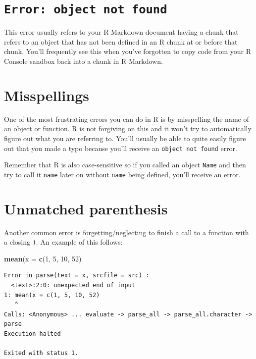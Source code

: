 \documentclass[]{tufte-book}
\newenvironment{Shaded}{\begin{snugshade}}{\end{snugshade}}
\newcommand{\KeywordTok}[1]{\textcolor[rgb]{0.13,0.29,0.53}{\textbf{{#1}}}}
\newcommand{\DataTypeTok}[1]{\textcolor[rgb]{0.13,0.29,0.53}{{#1}}}
\newcommand{\DecValTok}[1]{\textcolor[rgb]{0.00,0.00,0.81}{{#1}}}
\newcommand{\NormalTok}[1]{{#1}}
\begin{document}
\section{\texorpdfstring{\texttt{Error:\ object\ not\ found}}{Error: object not found}}\label{error-object-not-found}

This error usually refers to your R Markdown document having a chunk
that refers to an object that has not been defined in an R chunk at or
before that chunk. You'll frequently see this when you've forgotten to
copy code from your R Console sandbox back into a chunk in R Markdown.

\section{Misspellings}\label{misspellings}

One of the most frustrating errors you can do in R is by misspelling the
name of an object or function. R is not forgiving on this and it won't
try to automatically figure out what you are referring to. You'll
usually be able to quite easily figure out that you made a typo because
you'll receive an \texttt{object\ not\ found} error.

Remember that R is also case-sensitive so if you called an object
\texttt{Name} and then try to call it \texttt{name} later on without
\texttt{name} being defined, you'll receive an error.

\section{Unmatched parenthesis}\label{unmatched-parenthesis}

Another common error is forgetting/neglecting to finish a call to a
function with a closing \texttt{)}. An example of this follows:

\begin{Shaded}
\begin{Highlighting}[]
\KeywordTok{mean}\NormalTok{(}\DataTypeTok{x =} \KeywordTok{c}\NormalTok{(}\DecValTok{1}\NormalTok{, }\DecValTok{5}\NormalTok{, }\DecValTok{10}\NormalTok{, }\DecValTok{52}\NormalTok{)}
\end{Highlighting}
\end{Shaded}

\begin{verbatim}
Error in parse(text = x, srcfile = src) : 
  <text>:2:0: unexpected end of input
1: mean(x = c(1, 5, 10, 52)
   ^
Calls: <Anonymous> ... evaluate -> parse_all -> parse_all.character -> parse
Execution halted

Exited with status 1.
\end{verbatim}
\end{document}
